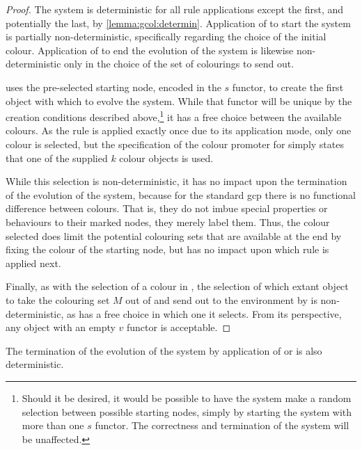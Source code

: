 \begin{proof}
The system is deterministic for all rule applications except the first, and potentially the last, by \cref{lemma:gcol:determin}.  Application of  to start the system is partially non-deterministic, specifically regarding the choice of the initial colour.  Application of  to end the evolution of the system is likewise non-deterministic only in the choice of the set of colourings to send out.

 uses the pre-selected starting node, encoded in the \(s\) functor, to create the first \bo{} object with which to evolve the system.  While that functor will be unique by the creation conditions described above,\footnote{Should it be desired, it would be possible to have the system make a random selection between possible starting nodes, simply by starting the system with more than one \(s\) functor.  The correctness and termination of the system will be unaffected.} it has a free choice between the available colours.  As the rule is applied exactly once due to its application mode, only one colour is selected, but the specification of the colour promoter for  simply states that one of the supplied \(k\) colour objects is used.

While this selection is non-deterministic, it has no impact upon the termination of the evolution of the system, because for the standard \gls{gcp} there is no functional difference between colours.  That is, they do not imbue special properties or behaviours to their marked nodes, they merely label them.  Thus, the colour selected does limit the potential colouring sets that are available at the end by fixing the colour of the starting node, but has no impact upon which rule is applied next.

Finally, as with the selection of a colour in , the selection of which extant \bo{} object to take the colouring set \(M\) out of and send out to the environment by  is non-deterministic, as  has a free choice in which one it selects.  From its perspective, any \bo{} object with an empty \(v\) functor is acceptable.
\end{proof}

\begin{lemma}\label{lemma:gcol:ending}
The termination of the evolution of the system by application of  or  is also deterministic.
\end{lemma}

